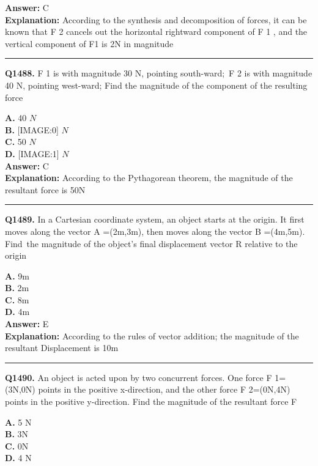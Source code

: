 \documentclass[12pt]{article}
\begin{document}
\textbf{Answer:} C \\
\textbf{Explanation:} According to the synthesis and decomposition of forces, it can be known that F
2
cancels out the horizontal rightward component of F
1
, and the vertical component of F1 is 2N in magnitude

\hrule
\vspace{1em}


\noindent
\textbf{Q1488.} F
1
is with magnitude 30 N, pointing south-ward; F
2
is with magnitude 40 N, pointing west-ward; Find the magnitude of the component of the resulting force



\textbf{A.} 40
$𝑁$ \\
\textbf{B.} [IMAGE:0]
$𝑁$ \\
\textbf{C.} 50
$𝑁$ \\
\textbf{D.} [IMAGE:1]
$𝑁$ \\

\textbf{Answer:} C \\
\textbf{Explanation:} According to the Pythagorean theorem, the magnitude of the resultant force is 50N

\hrule
\vspace{1em}


\noindent
\textbf{Q1489.} In a Cartesian coordinate system, an object starts at the origin. It first moves along the vector
A
=(2m,3m), then moves along the vector
B
=(4m,5m). Find the magnitude of the object's final displacement vector
R
relative to the origin



\textbf{A.} 9m \\
\textbf{B.} 2m \\
\textbf{C.} 8m \\
\textbf{D.} 4m \\

\textbf{Answer:} E \\
\textbf{Explanation:} According to the rules of vector addition; the magnitude of the resultant Displacement is 10m

\hrule
\vspace{1em}


\noindent
\textbf{Q1490.} An object is acted upon by two concurrent forces. One force
F
1​​=(3N,0N) points in the positive x-direction, and the other force
F
2​​=(0N,4N) points in the positive y-direction. Find the magnitude of the resultant force
F



\textbf{A.} 5
N \\
\textbf{B.} 3N \\
\textbf{C.} 0N \\
\textbf{D.} 4
N \\
\end{document}
